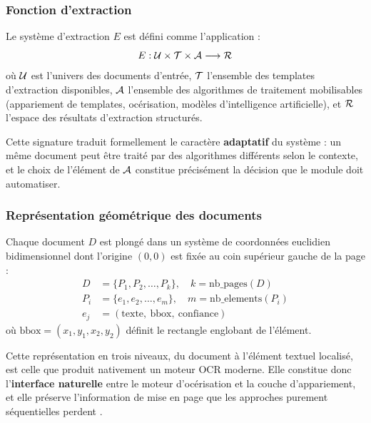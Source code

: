 \subsubsection{Fonction d'extraction}

\begin{definition}
\label{def:fonction-extraction}
Le système d'extraction $E$ est défini comme l'application :
\begin{equation}
E : \mathcal{U} \times \mathcal{T} \times \mathcal{A} \longrightarrow \mathcal{R}
\end{equation}
où $\mathcal{U}$ est l'univers des documents d'entrée, $\mathcal{T}$ l'ensemble des templates
d'extraction disponibles, $\mathcal{A}$ l'ensemble des algorithmes de traitement mobilisables
(appariement de templates, océrisation, modèles d'intelligence artificielle), et $\mathcal{R}$
l'espace des résultats d'extraction structurés.
\end{definition}

Cette signature traduit formellement le caractère \textbf{adaptatif} du système : un même
document peut être traité par des algorithmes différents selon le contexte, et le choix de
l'élément de $\mathcal{A}$ constitue précisément la décision que le module doit automatiser.

\subsubsection{Représentation géométrique des documents}

\begin{definition}
\label{def:structure-document}
Chaque document $D$ est plongé dans un système de coordonnées euclidien bidimensionnel dont
l'origine $(0,0)$ est fixée au coin supérieur gauche de la page :
\begin{align}
D &= \{P_1, P_2, \ldots, P_k\}, \quad k = \mathrm{nb\_pages}(D)\\
P_i &= \{e_1, e_2, \ldots, e_m\}, \quad m = \mathrm{nb\_elements}(P_i)\\
e_j &= (\mathrm{texte},\ \mathrm{bbox},\ \mathrm{confiance})
\end{align}
où $\mathrm{bbox} = (x_1, y_1, x_2, y_2)$ définit le rectangle englobant de l'élément.
\end{definition}

Cette représentation en trois niveaux, du document à l'élément textuel localisé, est celle
que produit nativement un moteur OCR moderne. Elle constitue donc l'\textbf{interface
naturelle} entre le moteur d'océrisation et la couche d'appariement, et elle préserve
l'information de mise en page que les approches purement séquentielles perdent
\cite{haralick1994document, aiello2002document}.

